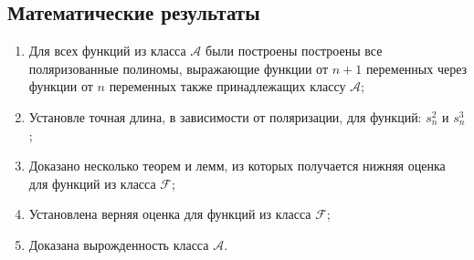 \documentclass[bibliography=totoc, a4paper, 14pt]{extarticle}
\begin{document}
\subsection{Математические результаты}
\begin{enumerate}
\item Для всех функций из класса $\mathcal{A}$ были построены построены все поляризованные
полиномы, выражающие функции от $n+1$ переменных через функции от $n$ переменных также принадлежащих
классу $\mathcal{A}$;
\item Установле точная длина, в зависимости от поляризации, для функций: $s^2_n$ и $s^3_n$;
\item Доказано несколько теорем и лемм, из которых получается нижняя оценка для функций из
класса $\mathcal{F}$;
\item Установлена верняя оценка для функций из класса $\mathcal{F}$;
\item Доказана вырожденность класса $\mathcal{A}$.
\end{enumerate}
\end{document}
